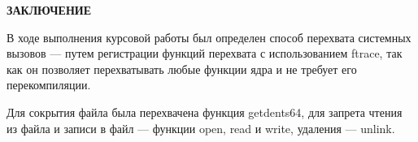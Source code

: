 \begin{center}
    \textbf{ЗАКЛЮЧЕНИЕ}
\end{center}

В ходе выполнения курсовой работы был определен способ перехвата системных вызовов — путем регистрации функций перехвата с использованием ftrace, так как он позволяет перехватывать любые функции ядра и не требует его перекомпиляции.

Для сокрытия файла была перехвачена функция getdents64, для запрета чтения из файла и записи в файл --- функции open, read и write, удаления --- unlink.
